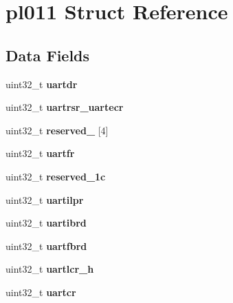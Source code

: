 \hypertarget{structpl011}{}\section{pl011 Struct Reference}
\label{structpl011}
\subsection*{Data Fields}
\begin{DoxyCompactItemize}
\item 
\mbox{\label{structpl011_aac8e9a731f5029d3f627178955a8adcd}} 
uint32\+\_\+t {\bfseries uartdr}
\item 
\mbox{\label{structpl011_afb1320140c49d94e837cd0e77aa64411}} 
uint32\+\_\+t {\bfseries uartrsr\+\_\+uartecr}
\item 
\mbox{\label{structpl011_aa86c8ffb0a80c212c88d25259b17e579}} 
uint32\+\_\+t {\bfseries reserved\+\_} \mbox{[}4\mbox{]}
\item 
\mbox{\label{structpl011_a52827c7bce04d5a7823bf5b58378a602}} 
uint32\+\_\+t {\bfseries uartfr}
\item 
\mbox{\label{structpl011_a4e27802c3355b2e687401e237681f01e}} 
uint32\+\_\+t {\bfseries reserved\+\_\+1c}
\item 
\mbox{\label{structpl011_a55be79f43f64e17ad6a0dfcf15fde9e2}} 
uint32\+\_\+t {\bfseries uartilpr}
\item 
\mbox{\label{structpl011_a41ef0f4e8d31bd261abb276906135513}} 
uint32\+\_\+t {\bfseries uartibrd}
\item 
\mbox{\label{structpl011_a0d6a50ab0e052bb643602551195811d7}} 
uint32\+\_\+t {\bfseries uartfbrd}
\item 
\mbox{\label{structpl011_a686c9cf97707804bd914e766418fc341}} 
uint32\+\_\+t {\bfseries uartlcr\+\_\+h}
\item 
\mbox{\label{structpl011_a3efc90cd0cba6d210486d90b1b455ef9}} 
uint32\+\_\+t {\bfseries uartcr}
\item 

\end{DoxyCompactItemize}
